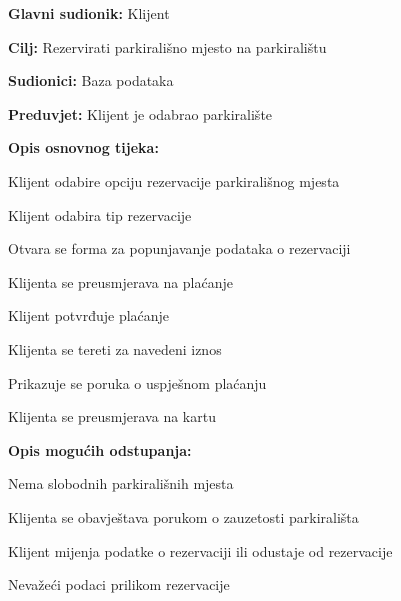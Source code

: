 \noindent {}
\begin{packed_item}
	
	\item \textbf{Glavni sudionik:} Klijent
	\item  \textbf{Cilj:} Rezervirati parkirališno mjesto na parkiralištu
	\item  \textbf{Sudionici:} Baza podataka
	\item  \textbf{Preduvjet:} Klijent je odabrao parkiralište
	\item  \textbf{Opis osnovnog tijeka:}
	
	\item[] \begin{packed_enum}
		
		\item Klijent odabire opciju rezervacije parkirališnog mjesta
		\item Klijent odabira tip rezervacije
		\item Otvara se forma za popunjavanje podataka o rezervaciji
		\item Klijenta se preusmjerava na plaćanje
		\item Klijent potvrđuje plaćanje
		\item Klijenta se tereti za navedeni iznos
		\item Prikazuje se poruka o uspješnom plaćanju
		\item Klijenta se preusmjerava na kartu
		
	\end{packed_enum}
	\item  \textbf{Opis mogućih odstupanja:}
	\item[] \begin{packed_item}
		
		\item[3.a] Nema slobodnih parkirališnih mjesta
		\item[] \begin{packed_enum}
			
			\item Klijenta se obavještava porukom o zauzetosti parkirališta
			\item Klijent mijenja podatke o rezervaciji ili odustaje od rezervacije
			
		\end{packed_enum}
		
		\item[3.b] Nevažeći podaci prilikom rezervacije
		\item[] \begin{packed_enum}
			

\end{packed_enum}
\end{packed_item}
\end{packed_item}
